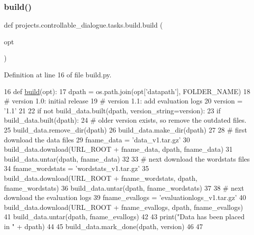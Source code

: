 \subsubsection{\texorpdfstring{build()}{build()}}
{\footnotesize\ttfamily def projects.\+controllable\+\_\+dialogue.\+tasks.\+build.\+build (\begin{DoxyParamCaption}\item[{}]{opt }\end{DoxyParamCaption})}



Definition at line 16 of file build.\+py.


\begin{DoxyCode}
16 \textcolor{keyword}{def }\hyperlink{namespacedialog__babi__feedback_1_1build_a7a9d289f7493a5ded13c4b7f071b6184}{build}(opt):
17     dpath = os.path.join(opt[\textcolor{stringliteral}{'datapath'}], FOLDER\_NAME)
18     \textcolor{comment}{# version 1.0: initial release}
19     \textcolor{comment}{# version 1.1: add evaluation logs}
20     version = \textcolor{stringliteral}{'1.1'}
21 
22     \textcolor{keywordflow}{if} \textcolor{keywordflow}{not} build\_data.built(dpath, version\_string=version):
23         \textcolor{keywordflow}{if} build\_data.built(dpath):
24             \textcolor{comment}{# older version exists, so remove the outdated files.}
25             build\_data.remove\_dir(dpath)
26         build\_data.make\_dir(dpath)
27 
28         \textcolor{comment}{# first download the data files}
29         fname\_data = \textcolor{stringliteral}{'data\_v1.tar.gz'}
30         build\_data.download(URL\_ROOT + fname\_data, dpath, fname\_data)
31         build\_data.untar(dpath, fname\_data)
32 
33         \textcolor{comment}{# next download the wordstats files}
34         fname\_wordstats = \textcolor{stringliteral}{'wordstats\_v1.tar.gz'}
35         build\_data.download(URL\_ROOT + fname\_wordstats, dpath, fname\_wordstats)
36         build\_data.untar(dpath, fname\_wordstats)
37 
38         \textcolor{comment}{# next download the evaluation logs}
39         fname\_evallogs = \textcolor{stringliteral}{'evaluationlogs\_v1.tar.gz'}
40         build\_data.download(URL\_ROOT + fname\_evallogs, dpath, fname\_evallogs)
41         build\_data.untar(dpath, fname\_evallogs)
42 
43         print(\textcolor{stringliteral}{"Data has been placed in "} + dpath)
44 
45         build\_data.mark\_done(dpath, version)
46 
47 
\end{DoxyCode}
\mbox{\label{namespaceprojects_1_1controllable__dialogue_1_1tasks_1_1build_a4ad8db760a5f21fd2efa3e09b47a0ec9}} 
